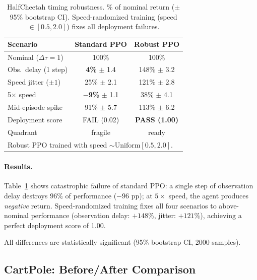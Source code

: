 \documentclass[10pt,twocolumn]{article}
\newcommand{\deltatau}{\Delta\tau}
\theoremstyle{plain}
\theoremstyle{definition}
\begin{document}
\begin{table}[t]
\centering
\caption{HalfCheetah timing robustness. \% of nominal return ($\pm$95\% bootstrap CI).
Speed-randomized training (speed $\in [0.5, 2.0]$) fixes all deployment failures.}
\label{tab:halfcheetah}
\small
\begin{tabular}{lcc}
\toprule
Scenario & Standard PPO & Robust PPO \\
\midrule
Nominal ($\deltatau=1$) & 100\% & 100\% \\
Obs.\ delay (1 step) & \textbf{4\%} $\pm$ 1.4 & 148\% $\pm$ 3.2 \\
Speed jitter ($\pm 1$) & 25\% $\pm$ 2.1 & 121\% $\pm$ 2.8 \\
5$\times$ speed & \textbf{$-$9\%} $\pm$ 1.1 & 38\% $\pm$ 4.1 \\
Mid-episode spike & 91\% $\pm$ 5.7 & 113\% $\pm$ 6.2 \\
\midrule
Deployment score & FAIL (0.02) & \textbf{PASS (1.00)} \\
Quadrant & fragile & ready \\
\bottomrule
\multicolumn{3}{l}{\small Robust PPO trained with speed $\sim \mathrm{Uniform}[0.5, 2.0]$.}
\end{tabular}
\vspace{-0.5em}
\end{table}

\paragraph{Results.}
Table~\ref{tab:halfcheetah} shows catastrophic failure of standard PPO: a single
step of observation delay destroys $96\%$ of performance ($-96$ pp); at $5\times$
speed, the agent produces \emph{negative} return. Speed-randomized training fixes
all four scenarios to above-nominal performance (observation delay: $+148\%$,
jitter: $+121\%$), achieving a perfect deployment score of 1.00.

All differences are statistically significant (95\% bootstrap CI, 2000 samples).

\subsection{CartPole: Before/After Comparison}
\label{sec:exp_cartpole}
\end{document}
